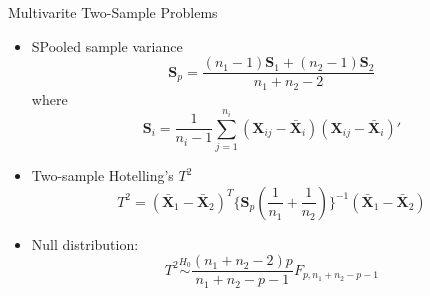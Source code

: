 \documentclass[
  ignorenonframetext,
]{beamer}
\begin{document}
\begin{frame}{Multivarite Two-Sample Problems}
\protect\hypertarget{multivarite-two-sample-problems-1}{}
\begin{itemize}
\item
  SPooled sample variance
  \[\mathbf{S}_p = \dfrac{(n_1-1)\mathbf{S}_1+(n_2-1)\mathbf{S}_2}{n_1+n_2-2}\]
  where
  \[\mathbf{S}_i = \dfrac{1}{n_i-1}\sum_{j=1}^{n_i}{(\mathbf X_{ij}-\bar{\mathbf X}_i)(\mathbf X_{ij}-\bar{\mathbf X}_i)'}\]
\item
  Two-sample Hotelling's \(T^2\)
  \[T^2 = {(\bar{\mathbf X}_1 - \bar{\mathbf X}_2)}^T\{\mathbf{S}_p(\frac{1}{n_1}+\frac{1}{n_2})\}^{-1} {(\bar{\mathbf X}_1 - \bar{\mathbf X}_2)}\]
\item
  Null distribution:
  \[T^2 \overset{H_0}\sim \frac{(n_1+n_2-2)p}{n_1+n_2-p-1} F_{p, n_1+n_2-p-1}\]
\end{itemize}
\end{frame}
\end{document}
